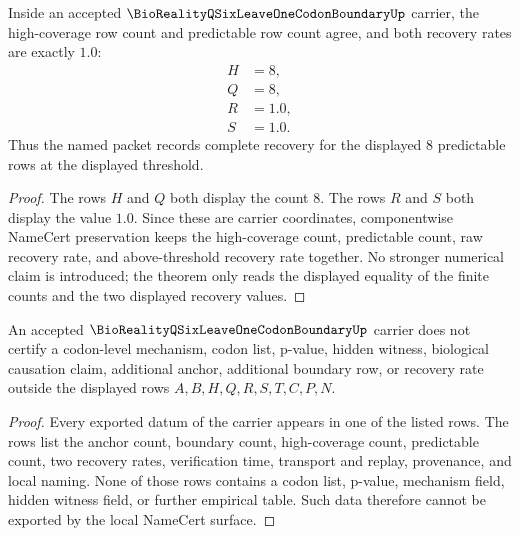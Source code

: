 \begin{theorem}
\label{thm:bioreality-q-six-leave-one-codon-boundary-complete-recovery}
Inside an accepted $\BioRealityQSixLeaveOneCodonBoundaryUp$ carrier, the high-coverage row count and predictable row count agree, and both recovery rates are exactly $1.0$:
$$
\begin{aligned}
H&=8,\\
Q&=8,\\
R&=1.0,\\
S&=1.0.
\end{aligned}
$$
Thus the named packet records complete recovery for the displayed $8$ predictable rows at the displayed threshold.
\end{theorem}

\begin{proof}
The rows $H$ and $Q$ both display the count $8$. The rows $R$ and $S$ both display the value $1.0$. Since these are carrier coordinates, componentwise NameCert preservation keeps the high-coverage count, predictable count, raw recovery rate, and above-threshold recovery rate together. No stronger numerical claim is introduced; the theorem only reads the displayed equality of the finite counts and the two displayed recovery values.
\end{proof}

\begin{theorem}
\label{thm:bioreality-q-six-leave-one-codon-boundary-nonescape}
An accepted $\BioRealityQSixLeaveOneCodonBoundaryUp$ carrier does not certify a codon-level mechanism, codon list, p-value, hidden witness, biological causation claim, additional anchor, additional boundary row, or recovery rate outside the displayed rows $A,B,H,Q,R,S,T,C,P,N$.
\end{theorem}

\begin{proof}
Every exported datum of the carrier appears in one of the listed rows. The rows list the anchor count, boundary count, high-coverage count, predictable count, two recovery rates, verification time, transport and replay, provenance, and local naming. None of those rows contains a codon list, p-value, mechanism field, hidden witness field, or further empirical table. Such data therefore cannot be exported by the local NameCert surface.
\end{proof}


